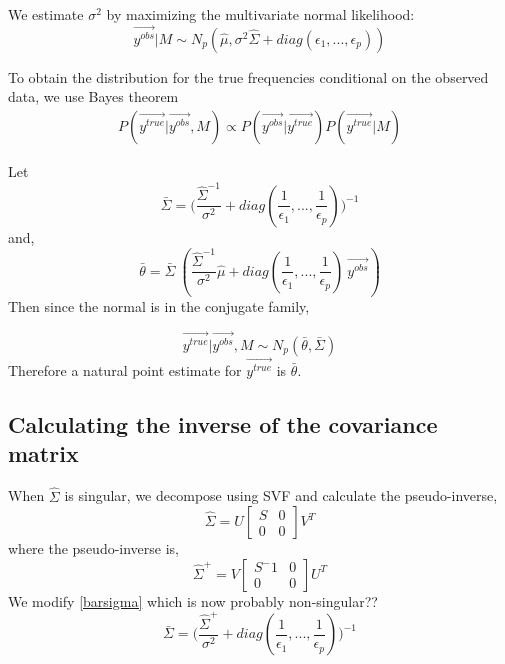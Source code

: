 \documentclass[10pt,a4paper,draft]{article}
\begin{document}
We estimate $\sigma^2$ by maximizing the multivariate normal likelihood:
\begin{equation}
 \vec{y^{obs}}|M \sim N_p(\hat{\mu}, \sigma^2\hat{\Sigma} + diag(\epsilon_1,...,\epsilon_p))
\end{equation}

To obtain the distribution for the true frequencies conditional on the observed data, we use Bayes theorem 
\begin{align*}
P(\vec{y^{true}} | \vec{y^{obs}}, M) \propto P(\vec{y^{obs}} | \vec{y^{true}}) P(\vec{y^{true}}|M)
\end{align*}

Let
\begin{equation} \label{barsigma}
\bar{\Sigma} = \big(\frac{\hat{\Sigma}^{-1}}{\sigma^2} + diag(\frac{1}{\epsilon_1},..., \frac{1}{\epsilon_p})\big)^{-1}
\end{equation}
and,
\begin{equation}
\bar{\theta} = \bar{\Sigma} \ (\frac{\hat{\Sigma}^{-1}}{\sigma^2}\hat{\mu} + diag(\frac{1}{\epsilon_1},..., \frac{1}{\epsilon_p}) \ \vec{y^{obs}})
\end{equation}
Then since the normal is in the conjugate family,

\begin{equation}
\vec{y^{true}} | \vec{y^{obs}}, M \sim N_p(\bar{\theta}, \bar{\Sigma})
\end{equation}
Therefore a natural point estimate for $\vec{y^{true}}$ is $\bar{\theta}$.

\subsection{Calculating the inverse of the covariance matrix}
When $\hat{\Sigma}$ is singular, we decompose using SVF and calculate the pseudo-inverse,
\begin{equation}
\hat{\Sigma} = U 
\begin{bmatrix} S & 0 \\ 0 & 0 \end{bmatrix} V^T
\end{equation}
where the pseudo-inverse is,
\begin{equation}
\hat{\Sigma}^{+} = V \begin{bmatrix} S^-1 & 0 \\ 0 & 0 \end{bmatrix} U^T
\end{equation}
We modify \ref{barsigma} which is now probably non-singular??
\begin{equation}
\bar{\Sigma} =  \big(\frac{\hat{\Sigma}^{+}}{\sigma^2} + diag(\frac{1}{\epsilon_1},..., \frac{1}{\epsilon_p})\big)^{-1}
\end{equation}
\end{document}
